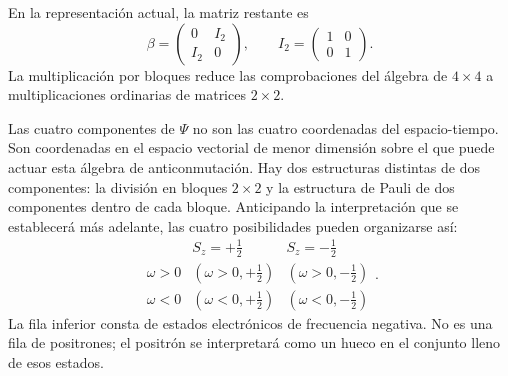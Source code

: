 \begin{classroomqa}
\end{classroomqa}

En la representación actual, la matriz restante es
\begin{equation}
\beta=
\begin{pmatrix}
0&I_2\\
I_2&0
\end{pmatrix},
\qquad
I_2=
\begin{pmatrix}
1&0\\
0&1
\end{pmatrix}.
\end{equation}
La multiplicación por bloques reduce las comprobaciones del álgebra de \(4\times4\) a multiplicaciones ordinarias de matrices \(2\times2\).

\begin{classroomqa}
\end{classroomqa}

Las cuatro componentes de \(\Psi\) no son las cuatro coordenadas del espacio-tiempo. Son coordenadas en el espacio vectorial de menor dimensión sobre el que puede actuar esta álgebra de anticonmutación. Hay dos estructuras distintas de dos componentes: la división en bloques \(2\times2\) y la estructura de Pauli de dos componentes dentro de cada bloque. Anticipando la interpretación que se establecerá más adelante, las cuatro posibilidades pueden organizarse así:
\begin{equation}
\begin{array}{c|cc}
& S_z=+\tfrac12 & S_z=-\tfrac12\\ \hline
\omega>0 & (\omega>0,+\tfrac12) & (\omega>0,-\tfrac12)\\
\omega<0 & (\omega<0,+\tfrac12) & (\omega<0,-\tfrac12)
\end{array}.
\end{equation}
La fila inferior consta de estados electrónicos de frecuencia negativa. No es una fila de positrones; el positrón se interpretará como un hueco en el conjunto lleno de esos estados.

